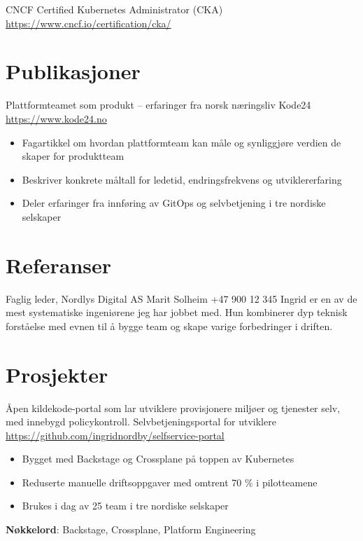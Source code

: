 \documentclass[a4paper, serif, 10pt]{moderncv}
\begin{document}
        {CNCF}
        {Certified Kubernetes Administrator (CKA)}
        {\url{https://www.cncf.io/certification/cka/}}
        {}
        {}
\section{Publikasjoner}

        {Plattformteamet som produkt – erfaringer fra norsk næringsliv}
        {Kode24}
        {\url{https://www.kode24.no}}
        {}
        {\begin{itemize}
\item Fagartikkel om hvordan plattformteam kan måle og synliggjøre verdien de skaper for produktteam
\item Beskriver konkrete måltall for ledetid, endringsfrekvens og utviklererfaring
\item Deler erfaringer fra innføring av GitOps og selvbetjening i tre nordiske selskaper
\end{itemize}}
\section{Referanser}

        {Faglig leder, Nordlys Digital AS}
        {Marit Solheim}
        {+47 900 12 345}
        {}
        {Ingrid er en av de mest systematiske ingeniørene jeg har jobbet med. Hun kombinerer
dyp teknisk forståelse med evnen til å bygge team og skape varige forbedringer i driften.}
\section{Prosjekter}

        {Åpen kildekode-portal som lar utviklere provisjonere miljøer og tjenester selv, med innebygd policykontroll.}
        {Selvbetjeningsportal for utviklere}
        {\url{https://github.com/ingridnordby/selfservice-portal}}
        {}
        {\begin{itemize}
\item Bygget med Backstage og Crossplane på toppen av Kubernetes
\item Reduserte manuelle driftsoppgaver med omtrent 70 \% i pilotteamene
\item Brukes i dag av 25 team i tre nordiske selskaper
\end{itemize}
\textbf{Nøkkelord}: Backstage, Crossplane, Platform Engineering}
\end{document}
